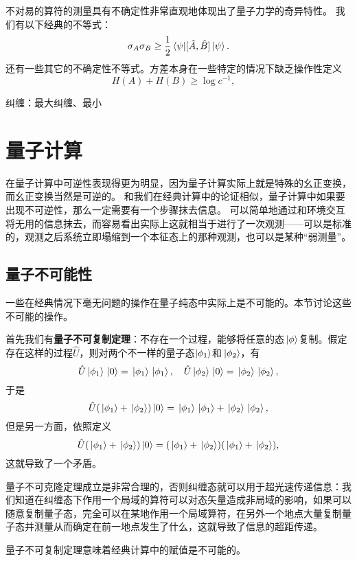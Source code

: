 \documentclass[UTF8, a4paper]{ctexart}
\begin{document}
不对易的算符的测量具有不确定性非常直观地体现出了量子力学的奇异特性。
我们有以下经典的不等式：
\begin{equation}
    \sigma_{A} \sigma_{B} \geq \frac{1}{2} \mel{\psi}{\comm*{\hat{A}}{\hat{B}}}{\psi}.
\end{equation}
还有一些其它的不确定性不等式。方差本身在一些特定的情况下缺乏操作性定义
\begin{equation}
    H(A) + H(B) \geq \log c^{-1}, \quad 
\end{equation}

纠缠：最大纠缠、最小

\section{量子计算}

在量子计算中可逆性表现得更为明显，因为量子计算实际上就是特殊的幺正变换，而幺正变换当然是可逆的。
和我们在经典计算中的论证相似，量子计算中如果要出现不可逆性，那么一定需要有一个步骤抹去信息。
可以简单地通过和环境交互将无用的信息抹去，而容易看出实际上这就相当于进行了一次观测——可以是标准的，观测之后系统立即塌缩到一个本征态上的那种观测，也可以是某种“弱测量”。

\subsection{量子不可能性}

一些在经典情况下毫无问题的操作在量子纯态中实际上是不可能的。本节讨论这些不可能的操作。

首先我们有\textbf{量子不可复制定理}：不存在一个过程，能够将任意的态$\ket*{\phi}$复制。假定存在这样的过程$\hat{U}$，则对两个不一样的量子态$\ket{\phi_1}$和$\ket*{\phi_2}$，有
\[
    \hat{U} \ket*{\phi_1} \ket*{0} = \ket*{\phi_1} \ket*{\phi_1}, \quad \hat{U} \ket*{\phi_2} \ket*{0} = \ket*{\phi_2} \ket*{\phi_2} ,
\]
于是
\[
    \hat{U} (\ket*{\phi_1} + \ket*{\phi_2}) \ket*{0} = \ket*{\phi_1} \ket*{\phi_1} + \ket*{\phi_2} \ket*{\phi_2},
\]
但是另一方面，依照定义
\[
    \hat{U} (\ket*{\phi_1} + \ket*{\phi_2}) \ket*{0} = (\ket*{\phi_1} + \ket*{\phi_2}) (\ket*{\phi_1} + \ket*{\phi_2}),
\]
这就导致了一个矛盾。

量子不可克隆定理成立是非常合理的，否则纠缠态就可以用于超光速传递信息：我们知道在纠缠态下作用一个局域的算符可以对态矢量造成非局域的影响，如果可以随意复制量子态，完全可以在某地作用一个局域算符，在另外一个地点大量复制量子态并测量从而确定在前一地点发生了什么，这就导致了信息的超距传递。

量子不可复制定理意味着经典计算中的赋值是不可能的。
\end{document}
